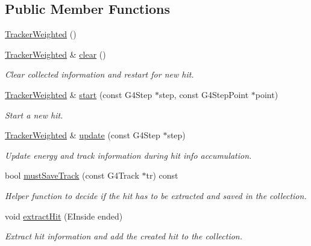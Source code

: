 \subsection*{Public Member Functions}
\begin{DoxyCompactItemize}
\item 
\hyperlink{struct_d_d4hep_1_1_simulation_1_1_tracker_weighted_ae628c5cfae79d839a0640338ba31a6ad}{Tracker\+Weighted} ()
\item 
\hyperlink{struct_d_d4hep_1_1_simulation_1_1_tracker_weighted}{Tracker\+Weighted} \& \hyperlink{struct_d_d4hep_1_1_simulation_1_1_tracker_weighted_a0c6304d5c3a6b0964f7388c3440235db}{clear} ()
\begin{DoxyCompactList}\small\item\em Clear collected information and restart for new hit. \end{DoxyCompactList}\item 
\hyperlink{struct_d_d4hep_1_1_simulation_1_1_tracker_weighted}{Tracker\+Weighted} \& \hyperlink{struct_d_d4hep_1_1_simulation_1_1_tracker_weighted_abb50962377c010e8430400035d5e3dcf}{start} (const G4\+Step $\ast$step, const G4\+Step\+Point $\ast$point)
\begin{DoxyCompactList}\small\item\em Start a new hit. \end{DoxyCompactList}\item 
\hyperlink{struct_d_d4hep_1_1_simulation_1_1_tracker_weighted}{Tracker\+Weighted} \& \hyperlink{struct_d_d4hep_1_1_simulation_1_1_tracker_weighted_a8ffc0941260d20698a82015cd39cf744}{update} (const G4\+Step $\ast$step)
\begin{DoxyCompactList}\small\item\em Update energy and track information during hit info accumulation. \end{DoxyCompactList}\item 
bool \hyperlink{struct_d_d4hep_1_1_simulation_1_1_tracker_weighted_aecd97f73f71f722a320badfe3272e374}{must\+Save\+Track} (const G4\+Track $\ast$tr) const
\begin{DoxyCompactList}\small\item\em Helper function to decide if the hit has to be extracted and saved in the collection. \end{DoxyCompactList}\item 
void \hyperlink{struct_d_d4hep_1_1_simulation_1_1_tracker_weighted_a8299b772daa5da7c49399a40c1de172d}{extract\+Hit} (E\+Inside ended)
\begin{DoxyCompactList}\small\item\em Extract hit information and add the created hit to the collection. \end{DoxyCompactList}\item 

\end{DoxyCompactItemize}
